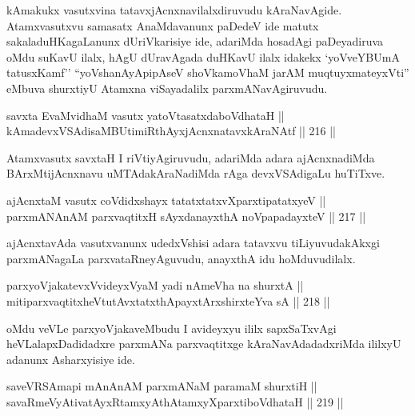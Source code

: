 
\begin{artha}
kAmakukx vasutxvina tatavxjAcnxnavilalxdiruvudu
kAraNavAgide. Atamxvasutxvu samasatx AnaMdavanunx paDedeV ide matutx
sakaladuHKagaLanunx dUriVkarisiye ide, adariMda hosadAgi paDeyadiruva 
oMdu suKavU ilalx, hAgU dUravAgada duHKavU ilalx idakekx `yoVveYBUmA
tatusxKamf'' ``yoV\s shanAyApipAseV shoVkamoVhaM jarAM
muqtuyxmateyxVti'' eMbuva shurxtiyU Atamxna viSayadalilx
parxmANavAgiruvudu.
\end{artha}

\begin{shl}
savxta EvaMvidhaM vasutx yatoV\s tasatxdaboVdhataH || \\
kAmadevxVSAdisaMBUtimiRthAyxjAcnxnatavxkAraNAtf \hfill || 216 ||  
\end{shl}

\begin{artha}
Atamxvasutx savxtaH I riVtiyAgiruvudu, adariMda adara ajAcnxnadiMda
BArxMtijAcnxnavu uMTAdakAraNadiMda rAga devxVSAdigaLu huTiTxve.
\end{artha}

\begin{shl}
ajAcnxtaM vasutx coVdidxshayx tatatxtatxvXparxtipatatxyeV || \\
parxmANAnAM parxvaqtitxH sAyxdanayxthA noVpapadayxteV \hfill || 217 ||  
\end{shl}

\begin{artha}
ajAcnxtavAda vasutxvanunx udedxVshisi adara tatavxvu tiLiyuvudakAkxgi
parxmANagaLa parxvataRneyAguvudu, anayxthA idu hoMduvudilalx.
\end{artha}

\begin{shl}
parxyoVjakatevxV\s videyxVyaM yadi nAmeVha na shurxtA || \\
mitiparxvaqtitxheVtutAvxtatxthA\s payxtArx\s \s shirxteYva sA \hfill || 218 ||  
\end{shl}

\begin{artha}
oMdu veVLe parxyoVjakaveMbudu I avideyxyu ililx sapxSaTxvAgi
heVLalapxDadidadxre parxmANa parxvaqtitxge kAraNavAdadadxriMda ililxyU
adanunx Asharxyisiye ide.
\end{artha}

\begin{shl}
saveVRSAmapi mAnAnAM parxmANaM paramaM shurxtiH || \\
savaRmeVyAtivatAyxRtamxyAthAtamxyXparxtiboVdhataH \hfill || 219 ||  
\end{shl}


